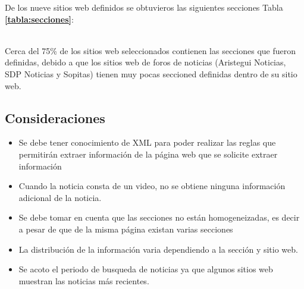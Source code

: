 De los nueve sitios web definidos se obtuvieros las siguientes secciones Tabla \textbf{\ref{tabla:secciones}}:
\\
\begin{table}[htbp]
  \centering
\end{table}
\\
Cerca del 75\% de los sitios web seleccionados contienen las secciones que fueron definidas, 
debido a que los sitios web de foros de noticias (Aristegui Noticias, SDP Noticias y Sopitas) 
tienen muy pocas seccioned definidas dentro de su sitio web.
\subsection{Consideraciones}
\begin{itemize}
  \item Se debe tener conocimiento de XML para poder realizar las reglas que permitirán extraer información de la página web que se solicite extraer 
  información
  \item Cuando la noticia consta de un video, no se obtiene ninguna información adicional de la noticia.
  \item Se debe tomar en cuenta que las secciones no están homogeneizadas, es decir a pesar de que de la misma página existan varias secciones 
  \item La distribución de la información varia dependiendo a la sección y sitio web.
  \item Se acoto el periodo de busqueda de noticias ya que algunos sitios web muestran las noticias más recientes.
\end{itemize}

